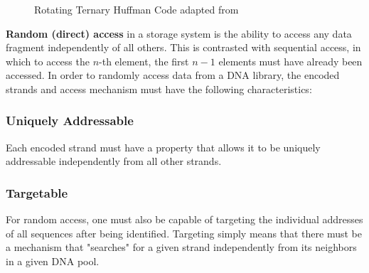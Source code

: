 \documentclass[a4paper,conference]{IEEEtran}
\begin{document}
\begin{figure}[!t]
\centering
{}
\caption{Rotating Ternary Huffman Code adapted from \cite{bornholt_dna-based_2016}}
\end{figure}

\textbf{Random (direct) access} in a storage system is the ability to access any data fragment independently of all others. This is contrasted with sequential access, in which to access the $n$-th element, the first $n-1$ elements must have already been accessed. In order to randomly access data from a DNA library, the encoded strands and access mechanism must have the following characteristics:

\subsubsection{Uniquely Addressable}
Each encoded strand must have a property that allows it to be uniquely addressable independently from all other strands.

\subsubsection{Targetable}
For random access, one must also be capable of targeting the individual addresses of all sequences after being identified. Targeting simply means that there must be a mechanism that "searches" for a given strand independently from its neighbors in a given DNA pool.
\end{document}

